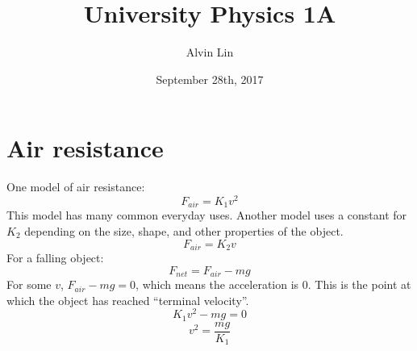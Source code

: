 \documentclass{math}
\title{University Physics 1A}
\author{Alvin Lin}
\date{September 28th, 2017}
\begin{document}
\maketitle

\section*{Air resistance}
One model of air resistance:
\[ F_{air} = K_1v^2 \]
This model has many common everyday uses. Another model uses a constant for
\( K_2 \) depending on the size, shape, and other properties of the
object.
\[ F_{air} = K_2v \]
For a falling object:
\[ F_{net} = F_{air}-mg \]
For some \( v \), \( F_{air}-mg = 0 \), which means the acceleration is 0. This
is the point at which the object has reached ``terminal velocity''.
\[ K_1v^2-mg = 0 \]
\[ v^2 = \frac{mg}{K_1} \]
\end{document}

